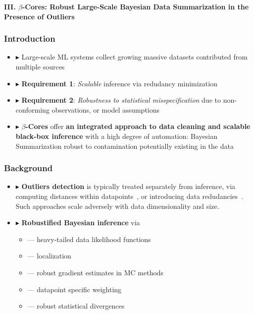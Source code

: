\documentclass[hyperref={colorlinks = true},unknownkeysallowed]{beamer}
\let\oldcitep=\citep
\renewcommand\citep[1]{\hypersetup{linkcolor=UBCblue}\hyperlink{#1}{\oldcitep{#1}}}
\begin{document}




\begin{frame}
	\LARGE{\textbf{III. $\beta$-Cores: Robust Large-Scale Bayesian Data Summarization in the Presence of Outliers}}
\end{frame}




\begin{frame}
	\frametitle{Introduction}
	\begin{itemize}
		\item $\blacktriangleright$ Large-scale ML systems collect growing massive datasets contributed from multiple sources
		\item $\blacktriangleright$ \textbf{Requirement 1}: \emph{Scalable} inference via redudancy minimization
		\item $\blacktriangleright$ \textbf{Requirement 2}: \emph{Robustness to statistical misspecification} due to non-conforming observations, or model assumptions   
		\item $\blacktriangleright$ \textbf{$\beta$-Cores} offer \textbf{an integrated approach to data cleaning and scalable black-box inference} with a high degree of automation: Bayesian Summarization robust to contamination potentially existing in the data 
	\end{itemize}
\end{frame}

\begin{frame}
	\frametitle{Background}
	\begin{itemize}
		\item $\blacktriangleright$ \textbf{Outliers detection} is typically treated separately from inference, via computing distances within datapoints~\citep{diakonikolas19, dickens20}, or introducing data redudancies~\citep{raykar10, karger11}. Such approaches scale adversely with data dimensionality and size.
		\item $\blacktriangleright$ \textbf{Robustified Bayesian inference} via 
			\begin{itemize}
				\item --- heavy-tailed data likelihood functions~\citep{huber09, insua12}
				\item --- localization~\citep{definetti61, wang18}
				\item --- robust gradient estimates in MC methods~\citep{bhatia19}
				\item --- datapoint specific weighting~\citep{wang17} 
				\item --- robust statistical divergences~\citep{futami18, knoblauch18, miller19}
			\end{itemize}
	\end{itemize}
\end{frame}
\end{document}
